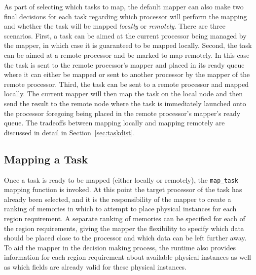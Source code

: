 As part of selecting which tasks to map, the default
mapper can also make two final decisions for each
task regarding which processor will perform the mapping
and whether the task will be mapped {\em locally} or
{\em remotely}. There are three scenarios.  First, a task
can be aimed at the current processor being managed
by the mapper, in which case it is guaranteed to be mapped
locally. Second, the task can be aimed at a remote processor
and be marked to map remotely.  In this case the task
is sent to the remote processor's mapper and placed in
its ready queue where it can either be mapped or sent to
another processor by the mapper of the remote processor.
Third, the task can be sent to a remote processor and 
mapped locally. The current mapper will
then map the task on the local node and then send the 
result to the remote node where the task is immediately
launched onto the processor foregoing being placed in 
the remote processor's mapper's ready queue. The tradeoffs
between mapping locally and mapping remotely are 
discussed in detail in Section~\ref{sec:taskdist}.

\subsection{Mapping a Task}
\label{subsec:maptask}
Once a task is ready to be mapped (either locally or
remotely), the {\tt map\_task} mapping function is invoked.
At this point the target processor of the task has
already been selected, and it is the responsibility
of the mapper to create a ranking of memories in which
to attempt to place physical instances for each region
requirement. A separate ranking of memories can be
specified for each of the region requirements, giving
the mapper the flexibility to specify which data should
be placed close to the processor and which data can
be left further away. To aid the mapper in the decision
making process, the runtime also provides information
for each region requirement about available physical
instances as well as which fields are already valid for 
these physical instances.

